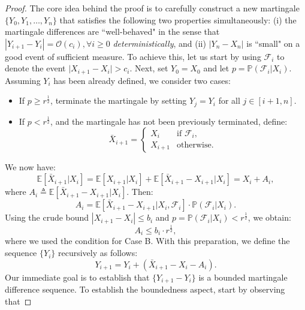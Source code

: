 \documentclass{article}
\newcommand{\mc}{\mathcal}
\begin{document}
\begin{proof}
    The core idea behind the proof is to carefully construct a new martingale \( \{Y_0, Y_1, \ldots, Y_n\} \) that satisfies the following two  properties simultaneously: (i) the martingale differences are ``well-behaved" in the sense that $|Y_{i+1} - Y_i| = \mc{O}(c_i), \forall i \geq 0$ \emph{deterministically}, and (ii) $|Y_n - X_n|$ is ``small" on a good event of sufficient measure. To achieve this, let us start by using \(\mathcal{F}_i\) to denote the event \( \lvert X_{i+1} - X_i \rvert > c_i \). Next, set \( Y_0 = X_0 \) and let \( p = \mathbb{P}(\mathcal{F}_i \lvert X_i) \). Assuming $Y_i$ has been already defined, we consider two cases:
    \begin{itemize}
        \item[(A)] If \( p \geq r^{\frac{1}{2}} \), terminate the martingale by setting \( Y_j = Y_i \) for all \( j \in [i+1, n] \).
        \item[(B)] If \( p < r^{\frac{1}{2}} \), and the martingale has not been previously terminated, define:
        \[
            \bar{X}_{i+1} =
            \begin{cases}
                X_i & \text{if } \mathcal{F}_i, \\
                X_{i+1} & \text{otherwise}.
            \end{cases} 
        \]
    \end{itemize}
    We now have: 
    \begin{equation}
        \mathbb{E}[\bar{X}_{i+1} \lvert X_i] = \mathbb{E}[X_{i+1} \lvert X_i] + \mathbb{E}[\bar{X}_{i+1} - X_{i+1} \lvert X_i] = X_i +A_i, 
\label{eqn:AZR_0}
   \end{equation}
    where \( A_i \triangleq \mathbb{E}[\bar{X}_{i+1} - X_{i+1} \lvert X_i] \). Then:
    \[
        A_i = \mathbb{E}[\bar{X}_{i+1} - X_{i+1} \lvert X_i, \mathcal{F}_i] \cdot \mathbb{P}(\mathcal{F}_i \lvert X_i).
    \]
    Using the crude bound \( |X_{i+1} - X_i| \leq b_i \) and \( p = \mathbb{P}(\mathcal{F}_i \lvert X_i) < r^{\frac{1}{2}} \), we obtain:
    \begin{equation}
        A_i \leq b_i \cdot r^{\frac{1}{2}},
        \label{eqn:AZR_1}
   \end{equation}
    where we used the condition for Case B. 
    With this preparation, we define the sequence $\{Y_i\}$ recursively as follows: 
    \[
        Y_{i+1} = Y_i + (\bar{X}_{i+1} - X_i - A_i). 
    \]
Our immediate goal is to establish that $\{Y_{i+1} - Y_{i}\}$ is a bounded martingale difference sequence. To establish the boundedness aspect, start by observing that

\end{proof}
\end{document}
